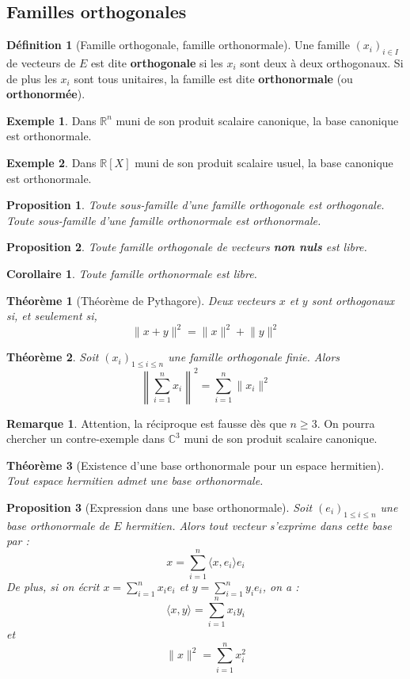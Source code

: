 \documentclass[french]{article}
\newcommand{\R}{\mathbb{R}}
\newcommand{\C}{\mathbb{C}}
\theoremstyle{plain}
\newtheorem{thm}{Théorème}
\newtheorem{prop}{Proposition}
\newtheorem{cor}{Corollaire}
\theoremstyle{definition}
\newtheorem{dfn}{Définition}
\newtheorem{exa}{Exemple}
\newtheorem{rmq}{Remarque}
\begin{document}
\subsection{Familles orthogonales}
\begin{dfn}[Famille orthogonale, famille orthonormale]
	Une famille $(x_i)_{i\in I}$ de vecteurs de $E$ est dite \textbf{orthogonale} si les $x_i$ sont deux à deux orthogonaux. Si de plus les $x_i$ sont tous unitaires, la famille est dite \textbf{orthonormale} (ou \textbf{orthonormée}).
\end{dfn}
\begin{exa}
	Dans $\R^n$ muni de son produit scalaire canonique, la base canonique est orthonormale.
\end{exa}
\begin{exa}
	Dans $\R[X]$ muni de son produit scalaire usuel, la base canonique est orthonormale.
\end{exa}
\begin{prop}
	Toute sous-famille d'une famille orthogonale est orthogonale. Toute sous-famille d'une famille orthonormale est orthonormale. 
\end{prop}
\begin{prop}
	Toute famille orthogonale de vecteurs \textbf{non nuls} est libre.
\end{prop}
\begin{cor}
	Toute famille orthonormale est libre.
\end{cor}
\begin{thm}[Théorème de Pythagore]
	Deux vecteurs $x$ et $y$ sont orthogonaux si, et seulement si, $$\lVert x+y\rVert^2=\lVert x\rVert^2+\lVert y\rVert^2$$
\end{thm}
\begin{thm}
	Soit $(x_i)_{1\leqslant i\leqslant n}$ une famille orthogonale finie. Alors $$\left\lVert \sum_{i=1}^{n}x_i\right\rVert^2=\sum_{i=1}^{n}\lVert x_i\rVert^2$$
\end{thm}
\begin{rmq} Attention, la réciproque est fausse dès que $n\geqslant 3$. On pourra chercher un contre-exemple dans $\C^3$ muni de son produit scalaire canonique. \end{rmq}
\begin{thm}[Existence d'une base orthonormale pour un espace hermitien]
	Tout espace hermitien admet une base orthonormale.
\end{thm}
\begin{prop}[Expression dans une base orthonormale]
	Soit $(e_i)_{1\leqslant i\leqslant n}$ une base orthonormale de $E$ hermitien. Alors tout vecteur s'exprime dans cette base par : $$x=\sum_{i=1}^{n}\langle x,e_i\rangle e_i$$ De plus, si on écrit $\displaystyle x=\sum_{i=1}^{n}x_ie_i$ et $\displaystyle y=\sum_{i=1}^{n}y_ie_i$, on a : $$\langle x,y\rangle =\sum_{i=1}^{n}x_iy_i$$ et $$\lVert x\rVert^2=\sum_{i=1}^{n}x_i^2$$
\end{prop}
\end{document}
